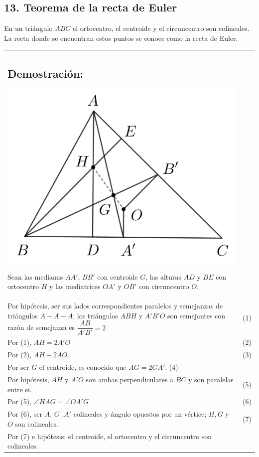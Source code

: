 \documentclass[12pt,a4paper]{article}
\begin{document}
\subsection*{13. Teorema de la recta de Euler}
En un triángulo $ABC$ el ortocentro, el centroide y el circuncentro son colineales. La recta donde se encuentran estos puntos se conoce como la recta de Euler.\\
\begin{tabular}{p{15.9 cm} p{1cm}}
\subsection*{Demostración:}
\begin{center}
\includegraphics[scale=0.7]{Imagenes/recta_euler.png} 
\end{center}
Sean las medianas $AA'$, $BB'$ con centroide $G$, las alturas $AD$ y $BE$ con ortocentro $H$ y las mediatrices $OA'$ y $OB'$ con circuncentro $O$.
\\Por hipótesis, ser sus lados correspondientes  paralelos y semejanzas de triángulos $A-A-A$; los triángulos $ABH$ y $A'B'O$ son semejantes con razón de semejanza es $\dfrac{AB}{A'B'}=2$ &(1)
\\Por (1), $AH=2A'O$ &(2)
\\Por (2), $AH+2AO$. &(3)
\\Por ser $G$ el centroide, es conocido que $AG= 2GA'$. (4)
\\Por hipótesis, $AH$ y $A'O$ son ambas perpendiculares a $BC$ y son paralelas entre si. & (5)
\\Por (5), $\angle HAG= \angle OA'G$ &(6)
\\Por (6), ser $A$, $G$ ,$A'$ colineales y ángulo opuestos por un vértice; $H, G$ y $O$ son colineales. &(7)
\\Por (7) e hipótesis; el centroide, el ortocentro y el circuncentro son colineales.
\end{tabular}
\end{document}
